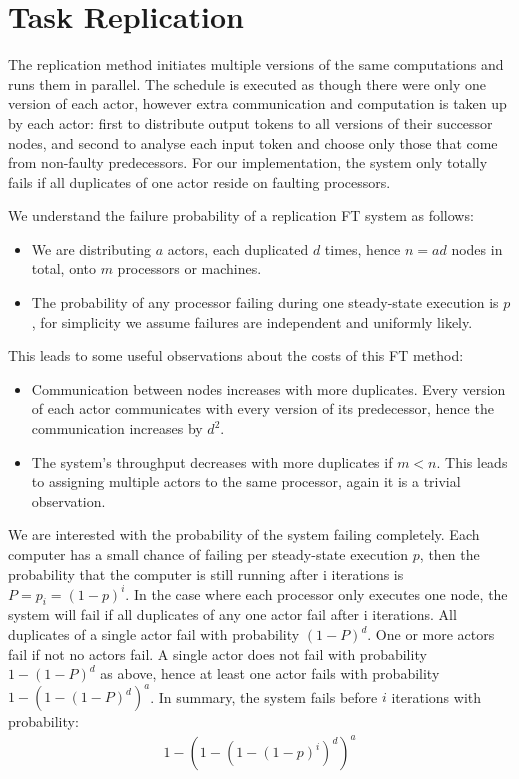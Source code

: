 \section{Task Replication}

The replication method initiates multiple versions of the same computations and runs them in parallel.
The schedule is executed as though there were only one version of each actor, however extra communication and computation is taken up by each actor: first to distribute output tokens to all versions of their successor nodes, and second to analyse each input token and choose only those that come from non-faulty predecessors.
For our implementation, the system only totally fails if all duplicates of one actor reside on faulting processors.

We understand the failure probability of a replication FT system as follows:
\begin{itemize}
	\item We are distributing $a$ actors, each duplicated $d$ times, hence $n = ad$ nodes in total, onto $m$ processors or machines.
	\item The probability of any processor failing during one steady-state execution is $p$, for simplicity we assume failures are independent and uniformly likely.
\end{itemize}

This leads to some useful observations about the costs of this FT method:
\begin{itemize}
	\item Communication between nodes increases with more duplicates.
			Every version of each actor communicates with every version of its predecessor, hence the communication increases by $d^2$.
	\item The system's throughput decreases with more duplicates if $m < n$.
			This leads to assigning multiple actors to the same processor, again it is a trivial observation.
\end{itemize}

We are interested with the probability of the system failing completely.
Each computer has a small chance of failing per steady-state execution $p$, then the probability that the computer is still running after i iterations is $P = p_i = (1-p)^i$.
In the case where each processor only executes one node, the system will fail if all duplicates of any one actor fail after i iterations.
All duplicates of a single actor fail with probability $(1-P)^d$.
One or more actors fail if not no actors fail.
A single actor does not fail with probability $1-(1-P)^d$ as above, hence at least one actor fails with probability $1-(1-(1-P)^d)^a$.
In summary, the system fails before $i$ iterations with probability:
\begin{align}
	\nonumber 1-(1-(1-(1-p)^i)^d)^a
\end{align}


